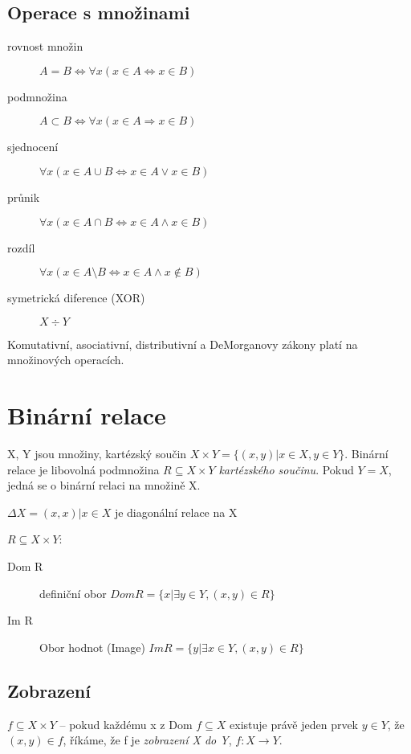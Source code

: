 \documentclass[a4paper, 11pt]{report}
\begin{document}
\subsection{Operace s množinami}

\begin{description}
	\item[rovnost množin] $A = B \iff \forall x (x \in A \iff x \in B)$
	\item[podmnožina] $ A \subset B \iff \forall x (x \in A \Rightarrow x \in B)$
	\item[sjednocení] $ \forall x (x \in A \cup B \iff x \in A \lor x \in B)$
	\item[průnik] $ \forall x ( x \in A \cap B \iff x \in A \land x \in B)$
	\item[rozdíl] $ \forall x ( x \in A \setminus B \iff x \in A \land x \notin B)$
	\item[symetrická diference (XOR)] $X \div Y$ 
\end{description}

Komutativní, asociativní, distributivní a DeMorganovy zákony platí na množinových operacích.

\section{Binární relace}

X, Y jsou množiny, kartézský součin $X \times Y = \{(x,y) | x \in X, y \in Y\}$. Binární relace je libovolná podmnožina $R \subseteq X \times Y$ \emph{kartézského součinu}. Pokud $Y = X$, jedná se o binární relaci na množině X.

$\Delta{}X = {(x,x) | x \in X}$ je diagonální relace na X

$R \subseteq X \times Y$:
\begin{description}
	\item[Dom R] definiční obor $Dom R = \{x | \exists y  \in Y, (x,y) \in R\}$
	\item[Im R] Obor hodnot (Image) $Im R = \{y | \exists x  \in Y, (x,y) \in R\}$
\end{description}

\subsection{Zobrazení}
$f \subseteq X \times Y$ -- pokud každému x z Dom $f \subseteq X$ existuje právě jeden prvek $y \in Y$, že $(x,y) \in f$, říkáme, že f je \emph{zobrazení X do Y}, $f: X \to Y$.
\end{document}
